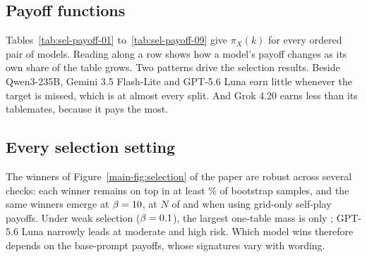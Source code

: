 \documentclass[10pt]{article}
\let\plainsubsection\subsection
\renewcommand{\subsection}{\FloatBarrier\needspace{8\baselineskip}\plainsubsection}
\begin{document}
\subsection{Payoff functions}

Tables~\ref{tab:sel-payoff-01} to~\ref{tab:sel-payoff-09} give $\pi_X(k)$ for every ordered pair of models. Reading along a row shows how a model's payoff changes as its own share of the table grows. Two patterns drive the selection results. Beside Qwen3-235B, Gemini 3.5 Flash-Lite and GPT-5.6 Luna earn little whenever the target is missed, which is at almost every split. And Grok 4.20 earns less than its tablemates, because it pays the most.

\begin{table}[h]
\caption{Payoff functions at $p=0.1$: mean expected payoff per seat of the model in the first column at a table with $k$ of its seats beside $6-k$ seats of the model in the second column (ten games per entry for $k\le5$; $k=6$ is self-play, 20 games, and is the same for every partner).}
\label{tab:sel-payoff-01}
\centering\small

\end{table}

\begin{table}[h]
\caption{Payoff functions at $p=0.5$, as in Table~\ref{tab:sel-payoff-01}.}
\label{tab:sel-payoff-05}
\centering\small

\end{table}

\begin{table}[h]
\caption{Payoff functions at $p=0.9$, as in Table~\ref{tab:sel-payoff-01}.}
\label{tab:sel-payoff-09}
\centering\small

\end{table}

\subsection{Every selection setting}

The winners of Figure~\ref{main-fig:selection} of the paper are robust across several checks: each winner remains on top in at least \SelBootMinPct\% of bootstrap samples, and the same winners emerge at $\beta=10$, at $N$ of \SelNExtra{} and when using grid-only self-play payoffs. Under weak selection ($\beta=0.1$), the largest one-table mass is only \SelWeakWithinMaxMass{}; GPT-5.6 Luna narrowly leads at moderate and high risk. Which model wins therefore depends on the base-prompt payoffs, whose signatures vary with wording.
\end{document}
